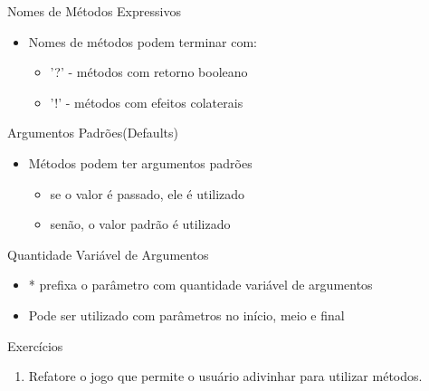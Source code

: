\begin{frame}[fragile,t]{Nomes de Métodos Expressivos}
  \begin{itemize}
    \item Nomes de métodos podem terminar com:
    \begin{itemize}
    	\item \alert{'?'} - métodos com retorno booleano
    	\item \alert{'!'} - métodos com efeitos colaterais
    \end{itemize}
    
	
  \end{itemize}   
\end{frame}

\begin{frame}[fragile,t]{Argumentos Padrões(Defaults)}
  \begin{itemize}
    \item Métodos podem ter argumentos padrões
    \begin{itemize}
    	\item se o valor é passado, ele é utilizado
    	\item senão, o valor padrão é utilizado
    \end{itemize}
  \end{itemize}  
  
\end{frame}

\begin{frame}[fragile,t]{Quantidade Variável de Argumentos}
  \begin{itemize}
    \item \alert{*} prefixa o parâmetro com quantidade variável de argumentos
  \end{itemize}
  \begin{itemize}
    \item Pode ser utilizado com parâmetros no início, meio e final
  \end{itemize}
  
\end{frame}
\begin{frame}{Exercícios}
  \begin{enumerate}
    \item Refatore o jogo que permite o usuário adivinhar para utilizar métodos. 
  \end{enumerate}
  
\end{frame}

